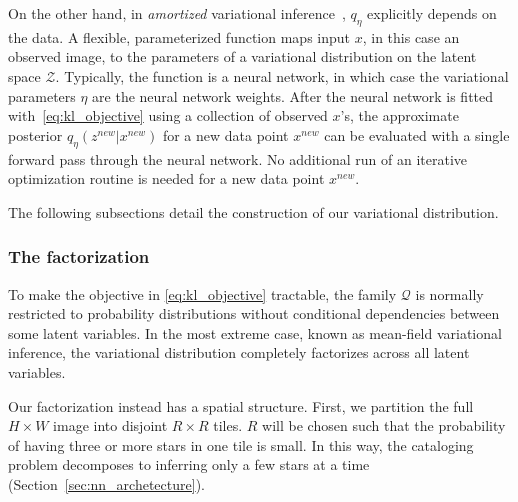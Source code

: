 On the other hand, 
in {\itshape amortized} variational
inference~\citep{kingma2013autoencoding, rezende2014stochastic}, $q_\eta$ explicitly depends on the data. 
A flexible, parameterized function maps input $x$, in this case an observed image, to the parameters of a variational distribution on the latent space $\mathcal{Z}$. 
Typically, the function is a neural network, in which case the variational parameters $\eta$ are the neural network weights. 
After the neural network is fitted with~\eqref{eq:kl_objective} using a collection of observed $x$'s, the approximate posterior $q_\eta(z^{new} | x^{new})$ for a new data point 
$x^{new}$ can be evaluated with a single forward pass through the neural network. 
No additional run of an iterative optimization routine is needed for a new data point $x^{new}$. 


The following subsections detail the construction of our variational distribution. 

\subsubsection{The factorization}
\label{sec:factorization}
To make the objective in \eqref{eq:kl_objective} tractable, the family $\mathcal{Q}$ is normally restricted to probability distributions 
without conditional dependencies between some latent variables. In the most extreme case, known as mean-field variational inference, the variational distribution completely factorizes across all latent variables. 

Our factorization instead has a spatial structure. 
First, we partition the full $H \times W$ image into disjoint $R \times R$ tiles. 
$R$ will be chosen such that the probability of having three or more stars in one tile is small. 
In this way, the cataloging problem decomposes to inferring only a few stars at a time (Section~\ref{sec:nn_archetecture}). 

